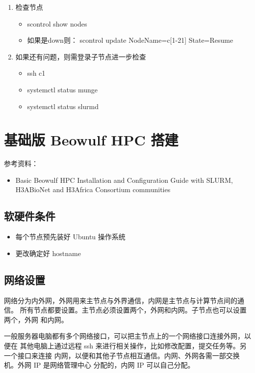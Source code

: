 {\begin{enumerate}
\item 检查节点
\begin{itemize}
\item scontrol show nodes

\item 如果是down则： scontrol update NodeName=c[1-21] State=Resume
\end{itemize}

\item 如果还有问题，则需登录子节点进一步检查
\begin{itemize}
\item ssh c1
\item systemctl status munge
\item systemctl status slurmd
\end{itemize}
\end{enumerate}











\chapter{基础版 Beowulf HPC 搭建}
参考资料：
\begin{itemize}
\item Basic Beowulf HPC Installation and Configuration Guide with SLURM, H3ABioNet and H3Africa Consortium communities

\end{itemize}


\section{软硬件条件}
\begin{itemize}
\item 每个节点预先装好 Ubuntu 操作系统
\item 更改确定好 hostname
\end{itemize}


\section{网络设置}
网络分为内外网，外网用来主节点与外界通信，内网是主节点与计算节点间的通信。
所有节点都要设置。主节点必须设置两个，外网和内网。子节点也可以设置两个，外网
和内网。

一般服务器电脑都有多个网络接口，可以把主节点上的一个网络接口连接外网，以便在
其他电脑上通过远程 ssh 来进行相关操作，比如修改配置，提交任务等。另一个接口来连接
内网，以便和其他子节点相互通信。内网、外网各需一部交换机。外网 IP 是网络管理中心
分配的，内网 IP 可以自己分配。

}
